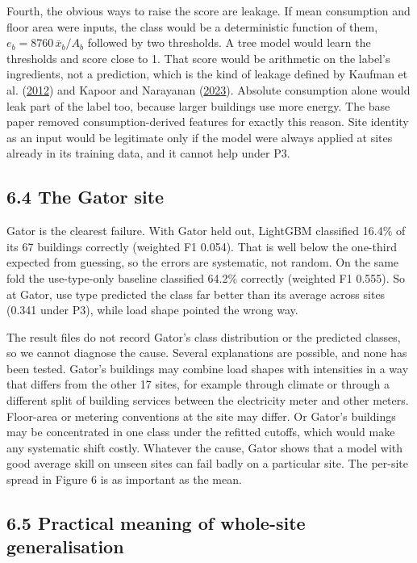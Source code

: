 \documentclass[
  10pt,
]{article}
\begin{document}
Fourth, the obvious ways to raise the score are leakage. If mean
consumption and floor area were inputs, the class would be a
deterministic function of them, \(e_b = 8760\,\bar{x}_b/A_b\) followed
by two thresholds. A tree model would learn the thresholds and score
close to 1. That score would be arithmetic on the label's ingredients,
not a prediction, which is the kind of leakage defined by Kaufman et al.
(\protect\hyperlink{ref-kaufman2012}{2012}) and Kapoor and Narayanan
(\protect\hyperlink{ref-kapoor2023}{2023}). Absolute consumption alone
would leak part of the label too, because larger buildings use more
energy. The base paper removed consumption-derived features for exactly
this reason. Site identity as an input would be legitimate only if the
model were always applied at sites already in its training data, and it
cannot help under P3.

\hypertarget{the-gator-site}{%
\subsection{6.4 The Gator site}\label{the-gator-site}}

Gator is the clearest failure. With Gator held out, LightGBM classified
16.4\% of its 67 buildings correctly (weighted F1 0.054). That is well
below the one-third expected from guessing, so the errors are
systematic, not random. On the same fold the use-type-only baseline
classified 64.2\% correctly (weighted F1 0.555). So at Gator, use type
predicted the class far better than its average across sites (0.341
under P3), while load shape pointed the wrong way.

The result files do not record Gator's class distribution or the
predicted classes, so we cannot diagnose the cause. Several explanations
are possible, and none has been tested. Gator's buildings may combine
load shapes with intensities in a way that differs from the other 17
sites, for example through climate or through a different split of
building services between the electricity meter and other meters.
Floor-area or metering conventions at the site may differ. Or Gator's
buildings may be concentrated in one class under the refitted cutoffs,
which would make any systematic shift costly. Whatever the cause, Gator
shows that a model with good average skill on unseen sites can fail
badly on a particular site. The per-site spread in Figure 6 is as
important as the mean.

\hypertarget{practical-meaning-of-whole-site-generalisation}{%
\subsection{6.5 Practical meaning of whole-site
generalisation}\label{practical-meaning-of-whole-site-generalisation}}
\end{document}
